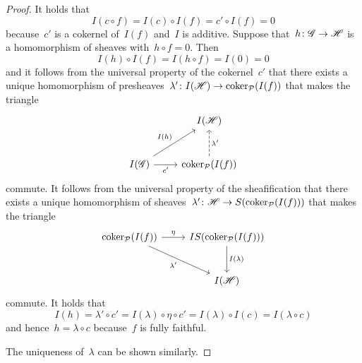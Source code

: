 \begin{example}
\begin{enumerate}
\begin{proof}
        It holds that
        \[
            I(c \circ f)
          = I(c) \circ I(f)
          = c' \circ I(f)
          = 0
        \]
        because~$c'$ is a cokernel of~$I(f)$ and~$I$ is additive.
        Suppose that~$h \colon \mathscr{G} \to \mathscr{H}$ is a homomorphism of sheaves with~$h \circ f = 0$.
        Then
        \[
          I(h) \circ I(f) = I(h \circ f) = I(0) = 0
        \]
        and it follows from the universal property of the cokernel~$c'$ that there exists a unique homomorphism of presheaves~$\lambda' \colon I(\mathscr{H}) \to \operatorname{coker}_{\mathcal{P}}(I(f))$ that makes the triangle
        \[
          \begin{tikzcd}[row sep = large]
              {}
            & I(\Hs)
            \\
              I(\Gs)
              \arrow{ur}[above left]{I(h)}
              \arrow{r}[below]{c'}
            & \coker_{\Pcat}(I(f))
              \arrow[dashed]{u}[right]{\lambda'}
          \end{tikzcd}
        \]
        commute. 
        It follows from the universal property of the sheafification that there exists a unique homomorphism of sheaves~$\lambda' \colon \mathscr{H} \to S(\operatorname{coker}_{\mathcal{P}}(I(f)))$ that makes the triangle
        \[
          \begin{tikzcd}[row sep = large]
              \coker_\Pcat(I(f))
              \arrow{r}[above]{\eta}
              \arrow{dr}[below left]{\lambda'}
            & IS(\coker_\Pcat(I(f)))
              \arrow{d}[right]{I(\lambda)}
            \\
              {}
            & I(\Hs)
          \end{tikzcd}
        \]
        commute.
        It holds that
        \[
            I(h)
          = \lambda' \circ c'
          = I(\lambda) \circ \eta \circ c'
          = I(\lambda) \circ I(c)
          = I(\lambda \circ c)
        \]
        and hence~$h = \lambda \circ c$ because~$f$ is fully faithful.
        
        The uniqueness of~$\lambda$ can be shown similarly.
      \end{proof}
      

\end{enumerate}
\end{example}
